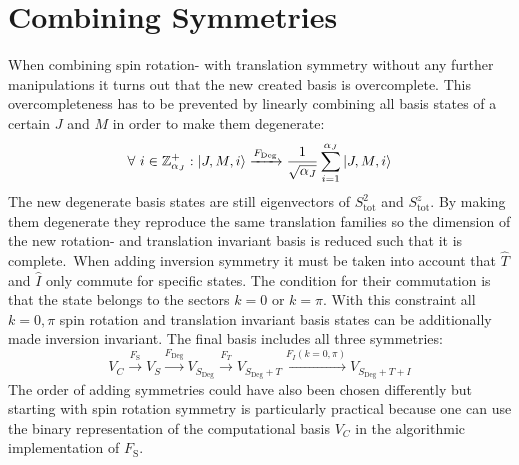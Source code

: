 \documentclass{scrartcl}
\begin{document}
\newpage
\section{Combining Symmetries}
When combining spin rotation- with translation symmetry without any further manipulations it turns out that the new created basis is overcomplete. This overcompleteness has to be prevented by linearly combining all basis states of a certain $J$ and $M$ in order to make them degenerate:
\begin{equation}
\forall \ i \in \mathbb{Z}_{\alpha_{J}}^+ : \ket{J,M,i} \xrightarrow[]{F_{\mathrm{Deg}}} \frac{1}{\sqrt{\alpha_J}}\sum_{i=1}^{\alpha_J} \ket{J,M,i}    
\end{equation}
The new degenerate basis states are still eigenvectors of $S^2_\mathrm{tot}$ and $S^z_\mathrm{tot}$. By making them degenerate they reproduce the same translation families so the dimension of the new rotation- and translation invariant basis is reduced such that it is complete.\
When adding inversion symmetry it must be taken into account that $\hat{T}$ and $\hat{I}$ only commute for specific states. The condition for their commutation is that the state belongs to the sectors $k=0$ or $k=\pi$. With this constraint all $k=0,\pi$ spin rotation and translation invariant basis states can be additionally made inversion invariant. The final basis includes all three symmetries:
\begin{equation}
   V_C \xrightarrow[]{F_{\mathrm{S}}} V_S \xrightarrow[]{F_{\mathrm{Deg}}} V_{S_{\mathrm{Deg}}} \xrightarrow[]{F_T} V_{S_{\mathrm{Deg}}+T} \xrightarrow[]{F_I(k=0,\pi)} V_{S_{\mathrm{Deg}}+T+I}
\end{equation}
The order of adding symmetries could have also been chosen differently but starting with spin rotation symmetry is particularly practical because one can use the binary representation of the computational basis $V_C$ in the algorithmic implementation of $F_{\mathrm{S}}$.

\newpage
\end{document}
